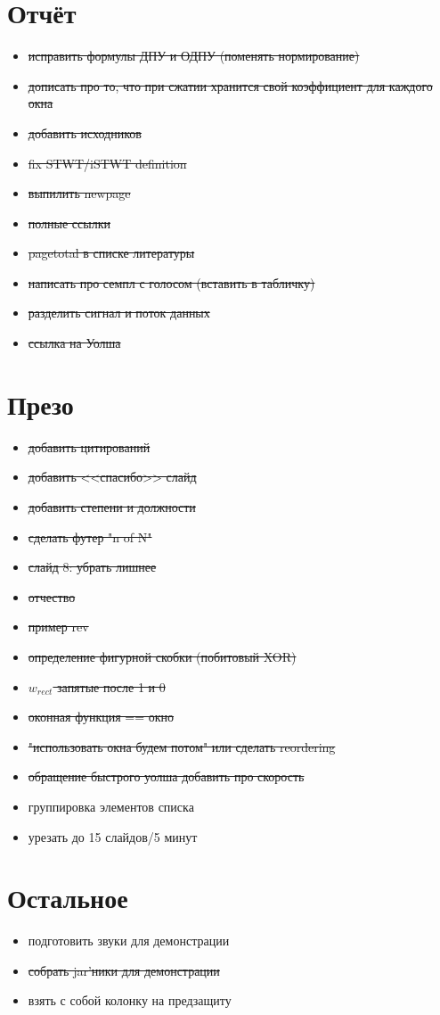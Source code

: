 \documentclass[a4paper]{article}
\begin{document}
\section*{Отчёт}
\begin{itemize}
  \item \sout{исправить формулы ДПУ и ОДПУ (поменять нормирование)}
  \item \sout{дописать про то, что при сжатии хранится свой коэффициент для каждого окна}
  
  \item \sout{добавить исходников}
  \item \sout{fix STWT/iSTWT definition}
  \item \sout{выпилить newpage}
  \item \sout{полные ссылки}
  \item \sout{pagetotal в списке литературы}
  \item \sout{написать про семпл с голосом (вставить в табличку)}
  \item \sout{разделить сигнал и поток данных}
  \item \sout{ссылка на Уолша}
\end{itemize}




\section*{Презо}
\begin{itemize}
  \item \sout{добавить цитирований}
  \item \sout{добавить <<спасибо>> слайд}
  \item \sout{добавить степени и должности}
  \item \sout{сделать футер "n of N"}
  \item \sout{слайд 8: убрать лишнее}
  \item \sout{отчество}
  \item \sout{пример rev}
  \item \sout{определение фигурной скобки (побитовый XOR)}
  \item \sout{$w_{rect}$ запятые после 1 и 0}
  \item \sout{оконная функция == окно}
  \item \sout{"использовать окна будем потом" или сделать reordering}
  \item \sout{обращение быстрого уолша добавить про скорость}
  \item группировка элементов списка
  \item урезать до 15 слайдов/5 минут
\end{itemize}





\section*{Остальное}
\begin{itemize}
  \item {подготовить звуки для демонстрации}
  \item \sout{собрать jar'ники для демонстрации}
  \item взять с собой колонку на предзащиту
\end{itemize}
\end{document}
